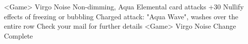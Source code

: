 <Game> Virgo Noise 
Non-dimming, Aqua Elemental card attacks +30 
Nullify effects of freezing or bubbling 
Charged attack: "Aqua Wave", washes over the entire row 
Check your mail for further details 
<Game> Virgo Noise Change Complete 
